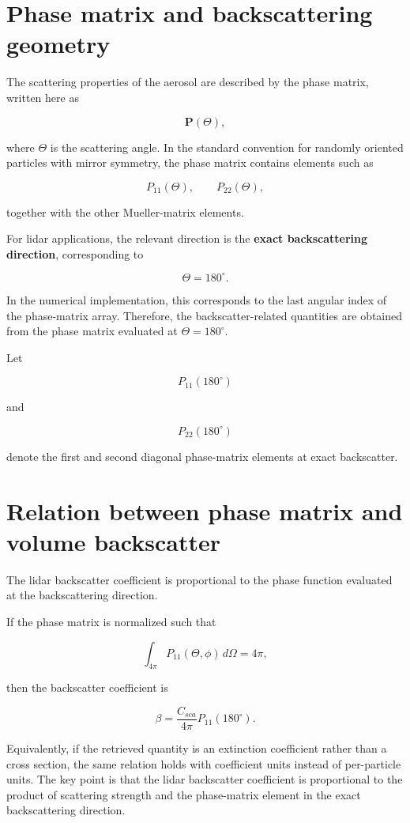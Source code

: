 \documentclass[
  letterpaper,
]{scrbook}
\begin{document}
\section{Phase matrix and backscattering
geometry}\label{phase-matrix-and-backscattering-geometry}

The scattering properties of the aerosol are described by the phase
matrix, written here as

\[
\mathbf{P}(\Theta),
\]

where \(\Theta\) is the scattering angle. In the standard convention for
randomly oriented particles with mirror symmetry, the phase matrix
contains elements such as

\[
P_{11}(\Theta), \qquad P_{22}(\Theta),
\]

together with the other Mueller-matrix elements.

For lidar applications, the relevant direction is the \textbf{exact
backscattering direction}, corresponding to

\[
\Theta = 180^\circ.
\]

In the numerical implementation, this corresponds to the last angular
index of the phase-matrix array. Therefore, the backscatter-related
quantities are obtained from the phase matrix evaluated at
\(\Theta = 180^\circ\).

Let

\[
P_{11}(180^\circ)
\]

and

\[
P_{22}(180^\circ)
\]

denote the first and second diagonal phase-matrix elements at exact
backscatter.

\section{Relation between phase matrix and volume
backscatter}\label{relation-between-phase-matrix-and-volume-backscatter}

The lidar backscatter coefficient is proportional to the phase function
evaluated at the backscattering direction.

If the phase matrix is normalized such that

\[
\int_{4\pi} P_{11}(\Theta,\phi)\, d\Omega = 4\pi,
\]

then the backscatter coefficient is

\[
\beta = \frac{C_{sca}}{4\pi} P_{11}(180^\circ).
\]

Equivalently, if the retrieved quantity is an extinction coefficient
rather than a cross section, the same relation holds with coefficient
units instead of per-particle units. The key point is that the lidar
backscatter coefficient is proportional to the product of scattering
strength and the phase-matrix element in the exact backscattering
direction.
\end{document}
